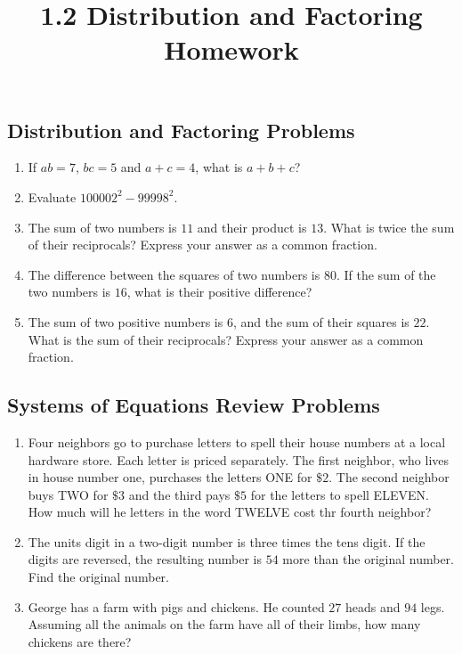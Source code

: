 \documentclass{article}
\title{1.2 Distribution and Factoring Homework}
\author{}
\date{}
\begin{document}
\maketitle

\subsection*{Distribution and Factoring Problems}
\begin{enumerate}
    \item If $ab = 7$, $bc = 5$ and $a + c = 4$, what is $a + b + c$?
    \vspace{3cm}
    \item Evaluate $100002^2 - 99998^2$.
    \vspace{3cm}
    \item The sum of two numbers is $11$ and their product is $13$.
        What is twice the sum of their reciprocals?
        Express your answer as a common fraction.
    \vspace{3cm}
    \item The difference between the squares of two numbers is $80$.
        If the sum of the two numbers is $16$, what is their positive difference?
    \vspace{3cm}
    \item The sum of two positive numbers is $6$, and the sum of their squares is $22$.
        What is the sum of their reciprocals? Express your answer as a common fraction.
\end{enumerate}

\newpage

\subsection*{Systems of Equations Review Problems}
\begin{enumerate}[resume]
    \item Four neighbors go to purchase letters to spell their house numbers at a local hardware store.
        Each letter is priced separately.
        The first neighbor, who lives in house number one, purchases the letters ONE for $\$2$.
        The second neighbor buys TWO for $\$3$ and the third pays $\$5$ for the letters to spell ELEVEN.
        How much will he letters in the word TWELVE cost thr fourth neighbor?
    \vspace{3cm}
    \item The units digit in a two-digit number is three times the tens digit.
        If the digits are reversed, the resulting number is $54$ more than the original number.
        Find the original number.
    \vspace{3cm}
    \item George has a farm with pigs and chickens.
        He counted $27$ heads and $94$ legs.
        Assuming all the animals on the farm have all of their limbs, how many chickens are there?
    \vspace{3cm}
\end{enumerate}
\end{document}

